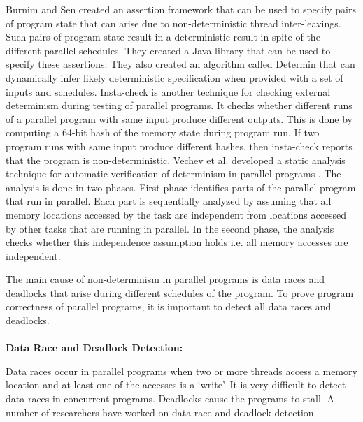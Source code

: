 Burnim and Sen created an assertion framework that can be used to specify pairs of program state that can arise due to non-deterministic thread inter-leavings\cite{burnim2009asserting}. Such pairs of program state result in a deterministic result in spite of the different parallel schedules. They created a Java library that can be used to specify these assertions. They also created an algorithm called Determin \cite{burnim2010determin} that can dynamically infer likely deterministic specification when provided with a set of inputs and schedules. Insta-check \cite{nistor2010instantcheck} is another technique for checking external determinism during testing of parallel programs. It checks whether different runs of a parallel program with same input produce different outputs. This is done by computing a 64-bit hash of the memory state during program run. If two program runs with same input produce different hashes, then insta-check reports that the program is non-deterministic. Vechev et al. developed a static analysis technique for automatic verification of determinism in parallel programs \cite{vechev2011automatic}. The analysis is done in two phases. First phase identifies parts of the parallel program that run in parallel. Each part is sequentially analyzed by assuming that all memory locations accessed by the task are independent from locations accessed by other tasks that are running in parallel. In the second phase, the analysis checks whether this independence assumption holds i.e. all memory accesses are independent.

The main cause of non-determinism in parallel programs is data races and deadlocks that arise during different schedules of the program. To prove program correctness of parallel programs, it is important to detect all data races and deadlocks.
\\
\\
\textbf{Data Race and Deadlock Detection: }

Data races occur in parallel programs when two or more threads access a memory location and at least one of the accesses is a ‘write’.  It is very difficult to detect data races in concurrent programs. Deadlocks cause the programs to stall. A number of researchers have worked on data race and deadlock detection.

